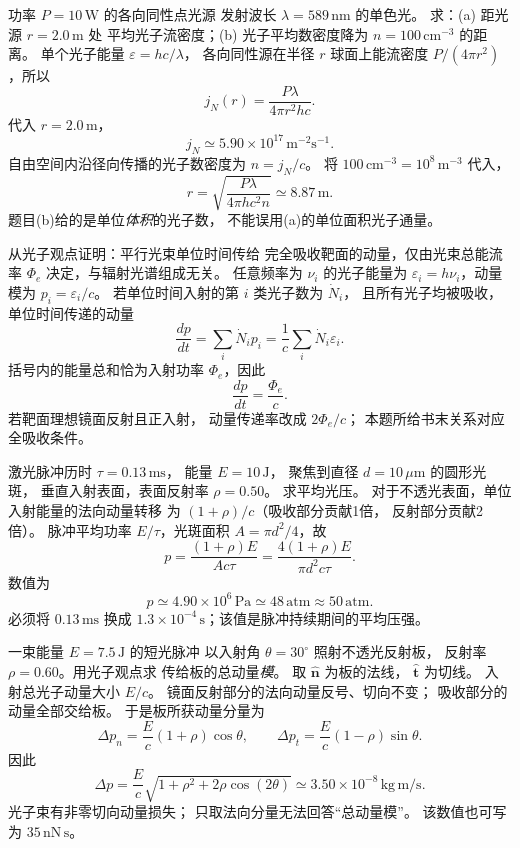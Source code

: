 功率 $P=10\,\mathrm W$ 的各向同性点光源
发射波长 $\lambda=589\,\mathrm{nm}$ 的单色光。
求：(a) 距光源 $r=2.0\,\mathrm m$ 处
平均光子流密度；(b) 光子平均数密度降为
$n=100\,\mathrm{cm^{-3}}$ 的距离。
\exsolution
单个光子能量 $\varepsilon=hc/\lambda$，
各向同性源在半径 $r$ 球面上能流密度
$P/(4\pi r^2)$，所以
\[
 \boxed{j_N(r)=\frac{P\lambda}{4\pi r^2hc}}.
\]
代入 $r=2.0\,\mathrm m$，
\[
 \boxed{j_N\simeq5.90\times10^{17}\,
 \mathrm{m^{-2}s^{-1}}}.
\]
自由空间内沿径向传播的光子数密度为 $n=j_N/c$。
将 $100\,\mathrm{cm^{-3}}=10^8\,\mathrm{m^{-3}}$ 代入，
\[
 \boxed{r=\sqrt{\frac{P\lambda}{4\pi hc^2n}}
 \simeq8.87\,\mathrm m}.
\]
\excheck 题目(b)给的是单位\emph{体积}的光子数，
不能误用(a)的单位面积光子通量。

从光子观点证明：平行光束单位时间传给
完全吸收靶面的动量，仅由光束总能流率
$\Phi_e$ 决定，与辐射光谱组成无关。
\exsolution
任意频率为 $\nu_i$ 的光子能量为
$\varepsilon_i=h\nu_i$，动量模为
$p_i=\varepsilon_i/c$。
若单位时间入射的第 $i$ 类光子数为 $\dot N_i$，
且所有光子均被吸收，单位时间传递的动量
\[
 \frac{dp}{dt}=\sum_i\dot N_i p_i
 =\frac1c\sum_i\dot N_i\varepsilon_i.
\]
括号内的能量总和恰为入射功率 $\Phi_e$，因此
\[
 \boxed{\frac{dp}{dt}=\frac{\Phi_e}{c}}.
\]
\excheck 若靶面理想镜面反射且正入射，
动量传递率改成 $2\Phi_e/c$；
本题所给书末关系对应全吸收条件。

激光脉冲历时 $\tau=0.13\,\mathrm{ms}$，
能量 $E=10\,\mathrm J$，
聚焦到直径 $d=10\,\mu\mathrm m$ 的圆形光斑，
垂直入射表面，表面反射率 $\rho=0.50$。
求平均光压。
\exsolution
对于不透光表面，单位入射能量的法向动量转移
为 $(1+\rho)/c$（吸收部分贡献1倍，
反射部分贡献2倍）。
脉冲平均功率 $E/\tau$，光斑面积
$A=\pi d^2/4$，故
\[
 \boxed{p=\frac{(1+\rho)E}{Ac\tau}
 =\frac{4(1+\rho)E}{\pi d^2c\tau}}.
\]
数值为
\[
 \boxed{p\simeq4.90\times10^6\,\mathrm{Pa}
 \simeq48\,\mathrm{atm}\approx50\,\mathrm{atm}}.
\]
\excheck 必须将 $0.13\,\mathrm{ms}$ 换成
$1.3\times10^{-4}\,\mathrm s$；该值是脉冲持续期间的平均压强。

一束能量 $E=7.5\,\mathrm J$ 的短光脉冲
以入射角 $\theta=30^\circ$ 照射不透光反射板，
反射率 $\rho=0.60$。用光子观点求
传给板的总动量\emph{模}。
\exsolution
取 $\hat{\boldsymbol n}$ 为板的法线，
$\hat{\boldsymbol t}$ 为切线。
入射总光子动量大小 $E/c$。
镜面反射部分的法向动量反号、切向不变；
吸收部分的动量全部交给板。
于是板所获动量分量为
\[
 \Delta p_n=\frac Ec(1+\rho)\cos\theta,\qquad
 \Delta p_t=\frac Ec(1-\rho)\sin\theta.
\]
因此
\[
 \boxed{\Delta p=\frac Ec
 \sqrt{1+\rho^2+2\rho\cos(2\theta)}
 \simeq3.50\times10^{-8}\,\mathrm{kg\,m/s}}.
\]
\excheck 光子束有非零切向动量损失；
只取法向分量无法回答“总动量模”。
该数值也可写为 $35\,\mathrm{nN\,s}$。

